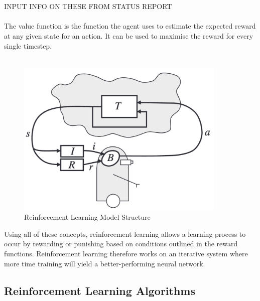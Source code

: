 \documentclass[a4paper,12pt]{article}
\begin{document}
\\\\
INPUT INFO ON THESE FROM STATUS REPORT
\\\\
The value function is the function the agent uses to estimate the expected reward at any given state for an action. It can be used to maximise the reward for every single timestep.
\\\\
\begin{figure}[H]
\centering
\includegraphics[width=10cm]{./imgs/RLGraph.png}
\caption{Reinforcement Learning Model Structure \cite{kaelbling1996reinforcement}}
\label{fig:RLGraph}
\end{figure}
Using all of these concepts, reinforcement learning allows a learning process to occur by rewarding or punishing based on conditions outlined in the reward functions. Reinforcement learning therefore works on an iterative system where more time training will yield a better-performing neural network.

\subsection{Reinforcement Learning Algorithms}
\end{document}

